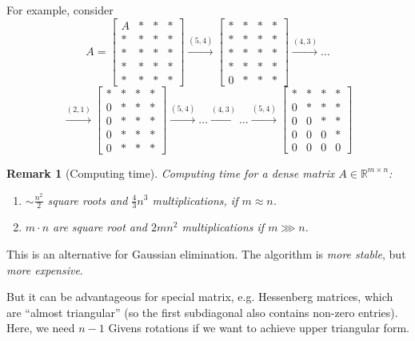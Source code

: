 \documentclass[a4paper]{article}
\numberwithin{lecref}{section}
\theoremstyle{break}
\newtheorem*{Remark}{Remark}
\begin{document}
For example, consider
\[ A = \begin{bmatrix} A & * & * & * \\ * & * & * & * \\ * & * & * & * \\ * & * & * & * \\ * & * & * & * \end{bmatrix} \xrightarrow{(5,4)} \begin{bmatrix} * & * & * & * \\ * & * & * & * \\ * & * & * & * \\ * & * & * & * \\ 0 & * & * & * \end{bmatrix} \xrightarrow{(4,3)} \dots \]
\[ \xrightarrow{(2,1)} \begin{bmatrix} * & * & * & * \\ 0 & * & * & * \\ 0 & * & * & * \\ 0 & * & * & * \\ 0 & * & * & * \end{bmatrix} \xrightarrow{(5,4)} \dots \xrightarrow{(4,3)} \dots \xrightarrow{(5,4)} \begin{bmatrix}  * & * & * & * \\ 0 & * & * & * \\ 0 & 0 & * & * \\ 0 & 0 & 0 & * \\ 0 & 0 & 0 & 0 \end{bmatrix} \]
\begin{Remark}[Computing time]
  Computing time for a dense matrix $A \in \mathbb R^{m \times n}$:
  \begin{enumerate}
    \item $\sim \frac{n^2}{2}$ square roots and $\frac43 n^3$ multiplications, if $m \approx n$.
    \item $m \cdot n$ are square root and $2mn^2$ multiplications if $m \ggg n$.
  \end{enumerate}
\end{Remark}
This is an alternative for Gaussian elimination. The algorithm is \emph{more stable}, but \emph{more expensive}.

But it can be advantageous for special matrix, e.g. Hessenberg matrices, which are \enquote{almost triangular} (so the first subdiagonal also contains non-zero entries).
Here, we need $n-1$ Givens rotations if we want to achieve upper triangular form.
\end{document}
